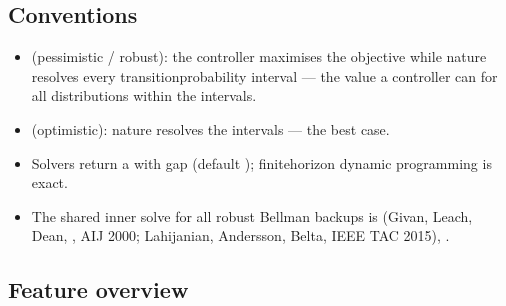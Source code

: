 \documentclass[a4paper,10pt,english]{sphinxmanual}
\begin{document}
\subsection{Conventions}
\label{\detokenize{manual/index:conventions}}\begin{itemize}
\item {} 
\sphinxAtStartPar
{} (pessimistic / robust): the controller maximises the objective while nature
resolves every transition\sphinxhyphen{}probability interval  — the value a
controller can  for all distributions within the intervals.

\item {} 
\sphinxAtStartPar
{} (optimistic): nature resolves the intervals  — the best case.

\item {} 
\sphinxAtStartPar
Solvers return a   with gap  (default
); finite\sphinxhyphen{}horizon dynamic programming is exact.

\item {} 
\sphinxAtStartPar
The shared inner solve for all robust Bellman backups is 
(Givan, Leach, Dean, , AIJ 2000; Lahijanian, Andersson,
Belta, IEEE TAC 2015), .

\end{itemize}


\subsection{Feature overview}
\label{\detokenize{manual/index:feature-overview}}
\end{document}
